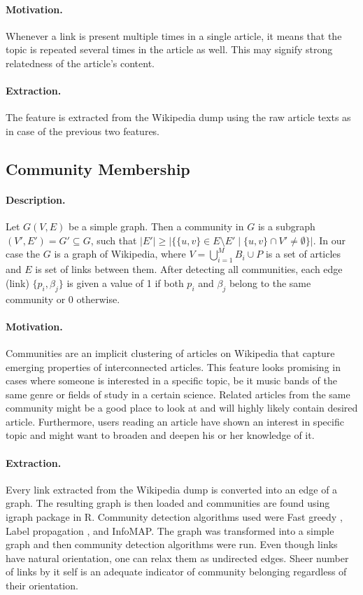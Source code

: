 \paragraph{Motivation.}
Whenever a link is present multiple times in a single article, it means that the topic is repeated several times in the article as well. This may signify strong relatedness of the article's content.

\paragraph{Extraction.}
The feature is extracted from the Wikipedia dump using the raw article texts as in case of the previous two features.



\subsection{Community Membership}
\label{community membership}
\paragraph{Description.}
Let $G(V,E)$ be a simple graph. Then a community in $G$ is a subgraph $(V', E') = G' \subseteq G$, such that $|E'| \ge |\{ \{u,v\} \in E\setminus E'  \; | \; \{u, v\} \cap V' \neq \emptyset \}|$. In our case the $G$ is a graph of Wikipedia, where $V = \bigcup_{i=1}^{M} B_i \cup P$ is a set of articles and $E$ is set of links between them. After detecting all communities, each edge (link) $\{p_i,\beta_j\}$ is given a value of 1 if both $p_i$ and $\beta_j$ belong to the same community or 0 otherwise.

\paragraph{Motivation.}
Communities are an implicit clustering of articles on Wikipedia that capture emerging properties of interconnected articles. This feature looks promising in cases where someone is interested in a specific topic, be it music bands of the same genre or fields of study in a certain science. Related articles from the same community might be a good place to look at and will highly likely contain desired article. Furthermore, users reading an article have shown an interest in specific topic and might want to broaden and deepen his or her knowledge of it.

\paragraph{Extraction.}
Every link extracted from the Wikipedia dump is converted into an edge of a graph. The resulting graph is then loaded and communities are found using igraph package in R. Community detection algorithms used were Fast greedy \cite{fast_greedy}, Label propagation \cite{label_propagation}, and InfoMAP\cite{infomap}. The graph was transformed into a simple graph and then community detection algorithms were run. Even though links have natural orientation, one can relax them as undirected edges. Sheer number of links by it self is an adequate indicator of community belonging regardless of their orientation.

